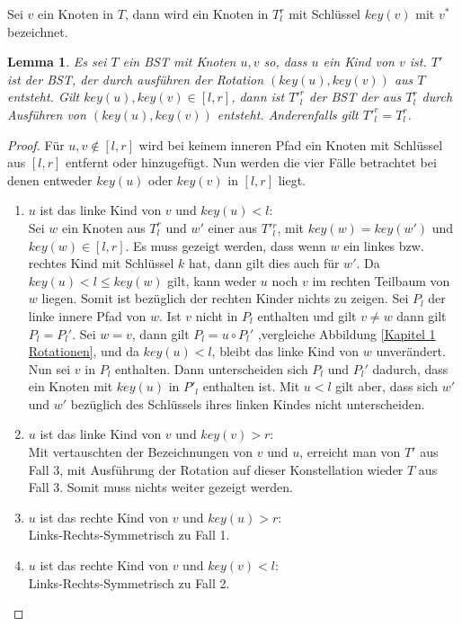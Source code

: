 \documentclass[a4paper,12pt]{article}
\begin{document}
 \noindent Sei $v$ ein Knoten in $T$, dann wird ein Knoten in $T^r_l$ mit Schlüssel $\mathit{key}(v)$  mit $v^*$ bezeichnet.  
\newtheorem{Lemma3}{Lemma}[section] \label{lemmaWilber1}
\begin{Lemma3} Es sei $T$ ein BST mit Knoten $u, v$ so, dass $u$ ein Kind von $v$ ist. $T'$ ist der BST, der durch ausführen der Rotation $\left(\mathit{key}\left(u\right),\mathit{key}\left(v\right)\right)$ aus $T$ entsteht. Gilt $\mathit{key}\left(u\right),\mathit{key}\left(v\right) \in \left[l,r\right]$, dann ist ${T'}^r_l$ der BST der aus $T^r_l$ durch Ausführen von  $\left(\mathit{key}\left(u\right),\mathit{key}\left(v\right)\right)$ entsteht. Anderenfalls gilt ${T'}^r_l = T^r_l$.
\end{Lemma3}
\begin{proof}
\noindent Für $u,v \notin \left[l,r\right]$ wird bei keinem inneren Pfad ein Knoten mit Schlüssel aus $\left[l,r\right]$ entfernt oder hinzugefügt.
Nun werden die vier Fälle betrachtet bei denen entweder $\mathit{key}\left(u\right)$ oder $\mathit{key}\left(v\right)$ in $\left[l,r\right]$ liegt.
\begin{enumerate}
	\item $u$ ist das linke Kind von $v$ und $\mathit{key}\left(u\right) < l$:\\
	 Sei $w$ ein Knoten aus $T^r_l$ und $w'$ einer aus $T'{^r_l}$, mit $\mathit{key}(w) = \mathit{key}(w')$ und $\mathit{key}(w) \in \left[l,r\right]$. Es muss gezeigt werden, dass wenn $w$ ein linkes bzw. rechtes Kind mit Schlüssel $k$ hat, dann gilt dies auch für $w'$. Da $\mathit{key}(u) < l \leq \mathit{key}(w) $ gilt, kann weder $u$ noch $v$ im rechten Teilbaum von $w$ liegen. Somit ist bezüglich der rechten Kinder nichts zu zeigen. 
	Sei $P_l$ der linke innere Pfad von $w$. Ist $v$ nicht in $P_l$ enthalten und gilt $v \neq w$ dann gilt $P_l = P{_l}'$. Sei $w = v$, dann gilt $P_l = u  \circ  {P_l}'$ ,vergleiche Abbildung \ref{Kapitel 1 Rotationen}, und da $\mathit{key}(u) < l$, bleibt das linke Kind von $w$ unverändert. Nun sei $v$ in $P_l$ enthalten. Dann unterscheiden sich  $P_l$ und  ${P_l}'$ dadurch, dass ein Knoten mit $\mathit{key}(u)$ in $P'_l$ enthalten ist. Mit $u < l$ gilt aber, dass sich $w'$ und $w'$ bezüglich des Schlüssels ihres linken Kindes nicht unterscheiden.
	\item $u$ ist das linke Kind von $v$ und $\mathit{key}\left(v\right) > r$:\\
		Mit vertauschten der Bezeichnungen von $v$ und $u$, erreicht man von $T'$ aus Fall 3, mit Ausführung der Rotation auf dieser Konstellation wieder $T$ aus Fall 3. Somit muss nichts weiter gezeigt werden. 
	\item $u$ ist das rechte Kind von $v$ und $\mathit{key}\left(u\right) > r$:\\
	    	Links-Rechts-Symmetrisch zu Fall 1. 
	\item $u$ ist das rechte Kind von $v$ und $\mathit{key}\left(v\right) < l$:\\
	Links-Rechts-Symmetrisch zu Fall 2. \\
       	    

\end{enumerate}
\end{proof}
\end{document}
